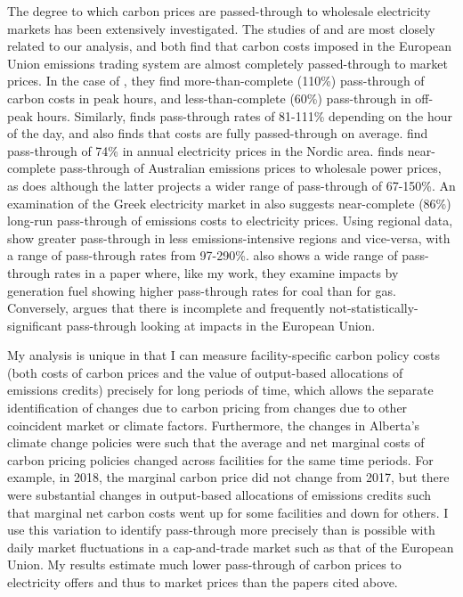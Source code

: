 \documentclass[12pt]{article}
\begin{document}
The degree to which carbon prices are passed-through to wholesale electricity markets has been extensively investigated. The studies of \cite{fabra_reguant} and \cite{hintermann16_germany} are most closely related to our analysis, and both find that carbon costs imposed in the European Union emissions trading system are almost completely passed-through to market prices. In the case of \citeauthor{fabra_reguant}, they find more-than-complete (110\%) pass-through of carbon costs in peak hours, and less-than-complete (60\%) pass-through in off-peak hours. Similarly, \citeauthor{hintermann16_germany} finds pass-through rates of 81-111\% depending on the hour of the day, and also finds that costs are fully passed-through on average. \cite{kara2008impacts} find pass-through of 74\% in annual electricity prices in the Nordic area. \cite{nazifi16} finds near-complete pass-through of Australian emissions prices to wholesale power prices, as does \citet{maryniak2019carbon} although the latter projects a wider range of pass-through of 67-150\%. An examination of the Greek electricity market in \cite{dagoumas2020carbon} also suggests near-complete (86\%) long-run pass-through of emissions costs to electricity prices. Using regional data, \cite{nazifi2021carbon} show greater pass-through in less emissions-intensive regions and vice-versa, with a range of pass-through rates from 97-290\%. \citet{guo_statistically_2020} also shows a wide range of pass-through rates in a paper where, like my work, they examine impacts by generation fuel showing higher pass-through rates for coal than for gas.  Conversely, \cite{jouvet_pass_through} argues that there is incomplete and frequently not-statistically-significant pass-through looking at impacts in the European Union.



My analysis is unique in that I can measure facility-specific carbon policy costs (both costs of carbon prices and the value of output-based allocations of emissions credits) precisely for long periods of time, which allows the separate identification of changes due to carbon pricing from changes due to other coincident market or climate factors. Furthermore, the changes in Alberta's climate change policies were such that the average and net marginal costs of carbon pricing policies changed across facilities for the same time periods. For example, in 2018, the marginal carbon price did not change from 2017, but there were substantial changes in output-based allocations of emissions credits such that marginal net carbon costs went up for some facilities and down for others. I use this variation to identify pass-through more precisely than is possible with daily market fluctuations in a cap-and-trade market such as that of the European Union. My results estimate much lower pass-through of carbon prices to electricity offers and thus to market prices than the papers cited above.
\end{document}
